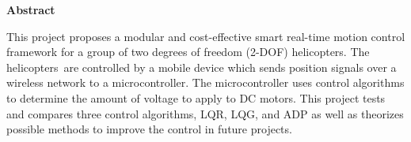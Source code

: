 
\begin{center}\textbf{Abstract}\end{center}


This project proposes a modular and cost-effective smart real-time motion control
framework for a group of two degrees of freedom (2-DOF) helicopters.  The helicopters are
controlled by a mobile device which sends position signals over a wireless network to a
microcontroller.  The microcontroller uses control algorithms to determine the amount of voltage
to apply to DC motors.  This project tests and compares three control algorithms, LQR, LQG, and
ADP as well as theorizes possible methods to improve the control in future projects.

\cleardoublepage


